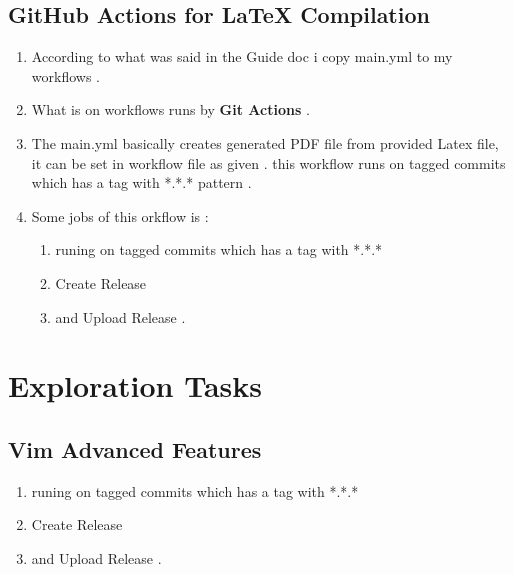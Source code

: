 \documentclass{article}
\begin{document}
\subsection{GitHub Actions for LaTeX Compilation}
\begin{enumerate}
    \item {According to what was said in the Guide doc i copy main.yml to my workflows .}
    \item {What is on workflows runs by \textbf{Git Actions} .}
    \item {The main.yml basically creates generated PDF file from provided Latex file, it can be set in workflow file as given . this workflow runs on tagged commits which has a tag with *.*.* pattern .}
    \item {Some jobs of this orkflow is :}
    	\begin{enumerate}
    		\item{ runing on tagged commits which has a tag with *.*.* }
    		\item{Create Release }
    		\item{ and Upload Release .}
    	\end{enumerate}
\end{enumerate}

\section{Exploration Tasks}
\subsection{Vim Advanced Features}
\begin{enumerate}
    \item{ runing on tagged commits which has a tag with *.*.* }
    \item{Create Release }
    \item{ and Upload Release .}
\end{enumerate}
\end{document}
